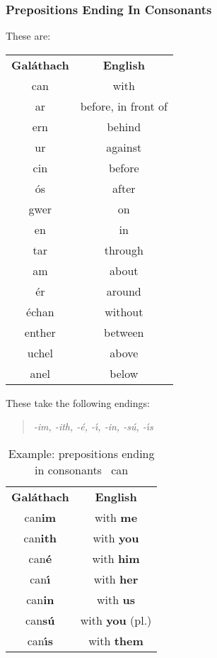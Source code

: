 \subsubsection{Prepositions Ending In Consonants}
These are:
\begin{table}[H]
\centering
\begin{tabular}{cc}
  \toprule
  \textbf{Gal\'{a}thach} & \textbf{English}\\
  \cmidrule(lr){1-1}\cmidrule(lr){2-2}
  can & with\\
  ar & before, in front of\\
  ern & behind\\
  ur & against\\
  cin & before\\
  \'{o}s & after\\
  gwer & on\\
  en & in\\
  tar & through\\
  am & about\\
  \'{e}r & around\\
  \'{e}chan & without\\
  enther & between\\
  uchel & above\\
  anel & below\\
  \bottomrule
\end{tabular}
\label{summary_prepositions_ending_in_consonants}
\end{table}

These take the following endings:
\begin{quote}
\textit{-im, -ith, -\'{e}, -\'{\i}, -in, -s\'{u}, -\'{\i}s}
\end{quote}

\begin{table}[H]
\centering
\begin{tabular}{cc}
  \toprule
  \textbf{Gal\'{a}thach} & \textbf{English}\\
  \cmidrule(lr){1-1}\cmidrule(lr){2-2}
  can\textbf{im} & with \textbf{me}\\
  can\textbf{ith} & with \textbf{you}\\
  can\textbf{\'{e}} & with \textbf{him}\\
  can\textbf{\'{\i}} & with \textbf{her}\\
  can\textbf{in} & with \textbf{us}\\
  can\textbf{s\'{u}} & with \textbf{you} (pl.)\\
  can\textbf{\'{\i}s} & with \textbf{them}\\
  \bottomrule
\end{tabular}
\caption{Example: prepositions ending in consonants \textendash\ can}
\label{example_prepositions_ending_in_consonants_can}
\end{table}

